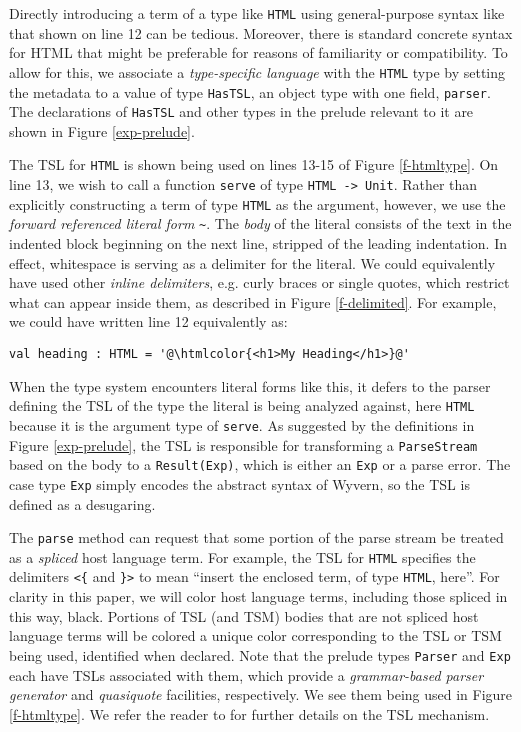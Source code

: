 \documentclass{sig-alternate}
\newcommand{\htmlcolor}[1]{\textcolor[HTML]{339933}{#1}}
\begin{document}
Directly introducing a term of a type like \verb|HTML| using general-purpose syntax like that shown on line 12 can be tedious. Moreover, there is standard concrete syntax for HTML that might be preferable for reasons of familiarity or compatibility. To allow for this, we associate a \emph{type-specific language} with the \verb|HTML| type by setting the metadata to a value of type \verb|HasTSL|, an object type with one field, \verb|parser|. The declarations of \verb|HasTSL| and other types in the prelude relevant to it are shown in Figure \ref{exp-prelude}. 

The TSL for \verb|HTML| is shown being used on lines 13-15 of Figure \ref{f-htmltype}. On line 13, we wish to call a function \verb|serve| of type \verb|HTML -> Unit|. Rather than explicitly constructing a term of type \verb|HTML| as the argument, however, we use the \emph{forward referenced literal form} \lstinline[style=wyvern]{~}. The \emph{body} of the literal consists of the text in the indented block beginning on the next line, stripped of the leading indentation. In effect, whitespace is serving as a delimiter for the literal. We could equivalently have used other \emph{inline delimiters}, e.g. curly braces or single quotes, which restrict what can appear inside them, as described in Figure \ref{f-delimited}. For example, we could have written line 12 equivalently as:
\begin{lstlisting}[style=wyvern, numbers=none, frame=none]
  val heading : HTML = '@\htmlcolor{<h1>My Heading</h1>}@'
\end{lstlisting}

When the type system encounters literal forms like this, it defers to the parser defining the TSL of the type the literal is being analyzed against, here \verb|HTML| because it is the argument type of \verb|serve|. As suggested by the definitions in Figure \ref{exp-prelude}, the TSL is responsible for transforming a \verb|ParseStream| based on the body to a \verb|Result(Exp)|, which is either an \verb|Exp| or a parse error. The case type \verb|Exp| simply encodes the abstract syntax of Wyvern, so the TSL is defined as a desugaring. 

The \verb|parse| method can request that some portion of the parse stream be treated as a \emph{spliced} host language term. For example, the TSL for \verb|HTML| specifies the delimiters \verb|<{| and \verb|}>| to mean ``insert the enclosed term, of type \verb|HTML|, here''. For clarity in this paper, we will color host language terms, including those spliced in this way, black. Portions of TSL (and TSM) bodies that are not spliced host language terms will be colored a unique color corresponding to the TSL or TSM being used, identified when declared. Note that the prelude types \verb|Parser| and \verb|Exp| each have TSLs associated with them, which provide a \emph{grammar-based parser generator} and \emph{quasiquote} facilities, respectively. We see them being used in Figure \ref{f-htmltype}. We refer the reader to \cite{TSLs} for further details on the TSL mechanism.
\end{document}
